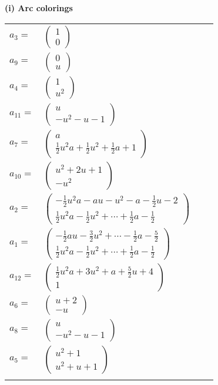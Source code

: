 \documentclass[1p]{elsarticle_modified}
\theoremstyle{definition}
\begin{document}
\flushleft \textbf{(i) Arc colorings}\\
\begin{tabular}{m{7pt} m{180pt} m{7pt} m{180pt} }
\flushright $a_{3}=$&$\begin{pmatrix}1\\0\end{pmatrix}$ \\
\flushright $a_{9}=$&$\begin{pmatrix}0\\u\end{pmatrix}$ \\
\flushright $a_{4}=$&$\begin{pmatrix}1\\u^2\end{pmatrix}$ \\
\flushright $a_{11}=$&$\begin{pmatrix}u\\- u^2- u-1\end{pmatrix}$ \\
\flushright $a_{7}=$&$\begin{pmatrix}a\\\frac{1}{2} u^2 a+\frac{1}{2} u^2+\frac{1}{2} a+1\end{pmatrix}$ \\
\flushright $a_{10}=$&$\begin{pmatrix}u^2+2 u+1\\- u^2\end{pmatrix}$ \\
\flushright $a_{2}=$&$\begin{pmatrix}-\frac{1}{2} u^2 a- a u- u^2- a-\frac{1}{2} u-2\\\frac{1}{2} u^2 a-\frac{1}{2} u^2+\cdots+\frac{1}{2} a-\frac{1}{2}\end{pmatrix}$ \\
\flushright $a_{1}=$&$\begin{pmatrix}-\frac{1}{2} a u-\frac{3}{2} u^2+\cdots-\frac{1}{2} a-\frac{5}{2}\\\frac{1}{2} u^2 a-\frac{1}{2} u^2+\cdots+\frac{1}{2} a-\frac{1}{2}\end{pmatrix}$ \\
\flushright $a_{12}=$&$\begin{pmatrix}\frac{1}{2} u^2 a+3 u^2+a+\frac{5}{2} u+4\\1\end{pmatrix}$ \\
\flushright $a_{6}=$&$\begin{pmatrix}u+2\\- u\end{pmatrix}$ \\
\flushright $a_{8}=$&$\begin{pmatrix}u\\- u^2- u-1\end{pmatrix}$ \\
\flushright $a_{5}=$&$\begin{pmatrix}u^2+1\\u^2+u+1\end{pmatrix}$\\&\end{tabular}
\end{document}
